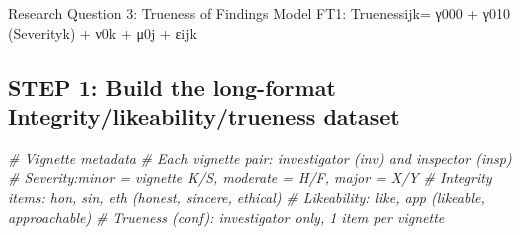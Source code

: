 \documentclass[
]{article}
\newenvironment{Shaded}{\begin{snugshade}}{\end{snugshade}}
\newcommand{\CommentTok}[1]{\textcolor[rgb]{0.56,0.35,0.01}{\textit{#1}}}
\begin{document}
Research Question 3: Trueness of Findings Model FT1: Truenessijk= γ000 +
γ010 (Severityk) + ν0k + μ0j + εijk

\subsection{STEP 1: Build the long-format Integrity/likeability/trueness
dataset}\label{step-1-build-the-long-format-integritylikeabilitytrueness-dataset}

\begin{Shaded}
\begin{Highlighting}[]
\CommentTok{\# Vignette metadata}
\CommentTok{\# Each vignette pair: investigator (inv) and inspector (insp)}
\CommentTok{\# Severity:minor = vignette K/S, moderate = H/F, major = X/Y}
\CommentTok{\# Integrity items: hon, sin, eth  (honest, sincere, ethical)}
\CommentTok{\# Likeability: like, app (likeable, approachable)}
\CommentTok{\# Trueness (conf): investigator only, 1 item per vignette}


\end{Highlighting}
\end{Shaded}
\end{document}
